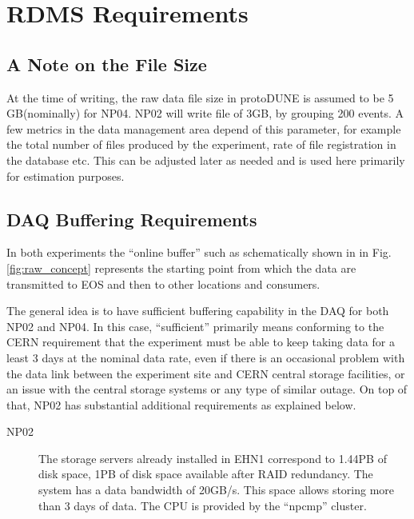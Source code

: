 \documentclass[12pt]{article}
\newcommand{\filesize}{5\,GB\xspace}
\begin{document}
{\section{RDMS Requirements}
\subsection{A Note on the File Size}
At the time of writing, the raw data file size in protoDUNE  is assumed to be \filesize (nominally) for NP04.
NP02 will write file of 3GB, by grouping 200 events. A few metrics in the data management area depend of this
parameter, for example the total number of files produced by the experiment, rate of file registration in the database etc. This can be adjusted
later as needed and is used here primarily for estimation purposes.

\subsection{DAQ Buffering Requirements}
\label{sec:daq_interface}
In both experiments the ``online buffer'' such as schematically shown in in Fig.\ref{fig:raw_concept} represents the starting
point from which the data are transmitted to EOS and then to other locations and consumers.

The general idea is to have sufficient buffering capability in the DAQ for both NP02 and NP04. In this case, ``sufficient''
primarily means conforming to the CERN requirement that the experiment must be able to keep taking data for a
least 3 days at the nominal data rate, even if there is an occasional problem with the data link between the
experiment site and CERN central storage facilities, or an issue with the central storage systems or any type of similar outage.
On top of that, NP02 has substantial additional requirements as explained below.
\begin{description}

\item[NP02] The storage servers already installed in EHN1 correspond to 1.44PB of disk space, 1PB of disk space available after RAID redundancy.
The system has a data bandwidth of 20GB/s.
This space allows storing more than 3 days of data.
The CPU is provided by the ``npcmp'' cluster.


\end{description}}
\end{document}
